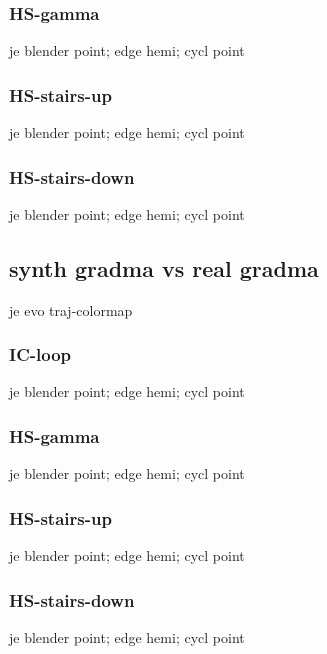 \subsubsection{HS-gamma}
je blender point; edge hemi; cycl point
\subsubsection{HS-stairs-up}
je blender point; edge hemi; cycl point
\subsubsection{HS-stairs-down}
je blender point; edge hemi; cycl point

\subsection{synth gradma vs real gradma}
je evo traj-colormap
\subsubsection{IC-loop}
je blender point; edge hemi; cycl point
\subsubsection{HS-gamma}
je blender point; edge hemi; cycl point
\subsubsection{HS-stairs-up}
je blender point; edge hemi; cycl point
\subsubsection{HS-stairs-down}
je blender point; edge hemi; cycl point
